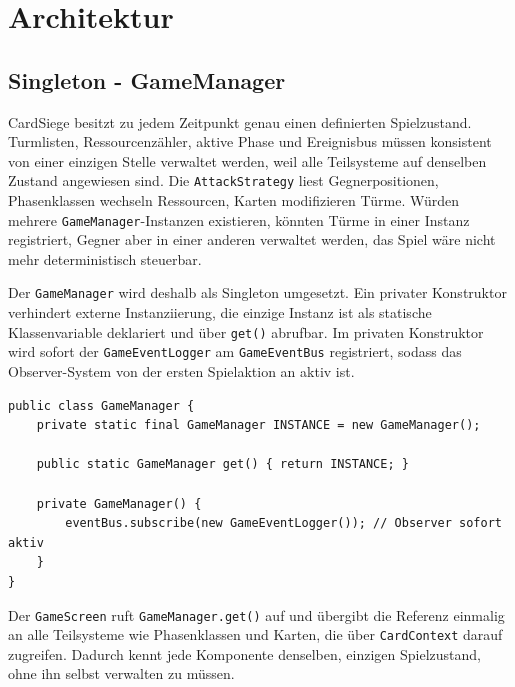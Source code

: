 \section{Architektur}

\subsection{Singleton - GameManager}

CardSiege besitzt zu jedem Zeitpunkt genau einen definierten Spielzustand.
Turmlisten, Ressourcenzähler, aktive Phase und Ereignisbus müssen konsistent
von einer einzigen Stelle verwaltet werden, weil alle Teilsysteme auf denselben
Zustand angewiesen sind. Die \texttt{AttackStrategy} liest Gegnerpositionen,
Phasenklassen wechseln Ressourcen, Karten modifizieren Türme. Würden mehrere
\texttt{GameManager}-Instanzen existieren, könnten Türme in einer Instanz
registriert, Gegner aber in einer anderen verwaltet werden, das Spiel wäre
nicht mehr deterministisch steuerbar.

Der \texttt{GameManager} wird deshalb als Singleton umgesetzt. Ein privater
Konstruktor verhindert externe Instanziierung, die einzige Instanz ist als
statische Klassenvariable deklariert und über \texttt{get()} abrufbar. Im
privaten Konstruktor wird sofort der \texttt{GameEventLogger} am
\texttt{GameEventBus} registriert, sodass das Observer-System von der ersten
Spielaktion an aktiv ist.

\begin{lstlisting}[caption={Singleton-Implementierung des GameManagers},label=lst:singleton]
public class GameManager {
    private static final GameManager INSTANCE = new GameManager();

    public static GameManager get() { return INSTANCE; }

    private GameManager() {
        eventBus.subscribe(new GameEventLogger()); // Observer sofort aktiv
    }
}
\end{lstlisting}

Der \texttt{GameScreen} ruft \texttt{GameManager.get()} auf und übergibt die
Referenz einmalig an alle Teilsysteme wie Phasenklassen und Karten, die über
\texttt{CardContext} darauf zugreifen. Dadurch kennt jede Komponente denselben,
einzigen Spielzustand, ohne ihn selbst verwalten zu müssen.

